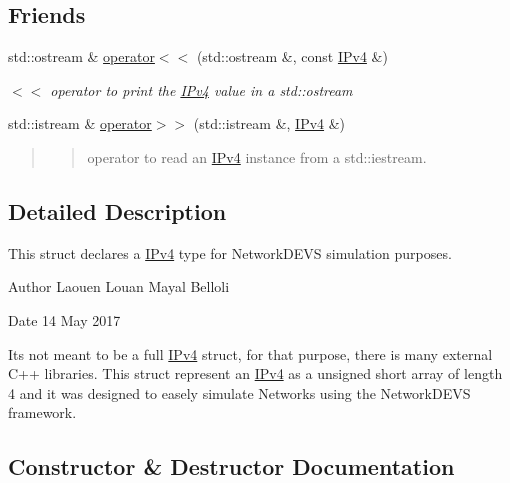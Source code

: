 \subsection*{Friends}
\begin{DoxyCompactItemize}
\item 
std\+::ostream \& \hyperlink{structIPv4_ab5644dcfa13678c430f256332e31c671}{operator$<$$<$} (std\+::ostream \&, const \hyperlink{structIPv4}{I\+Pv4} \&)
\begin{DoxyCompactList}\small\item\em $<$$<$ operator to print the \hyperlink{structIPv4}{I\+Pv4} value in a std\+::ostream \end{DoxyCompactList}\item 
std\+::istream \& \hyperlink{structIPv4_a47e7e07277bbcacf06f17b1c2fc59f7f}{operator$>$$>$} (std\+::istream \&, \hyperlink{structIPv4}{I\+Pv4} \&)
\begin{DoxyCompactList}\small\item\em \begin{quote}
\begin{quote}
operator to read an \hyperlink{structIPv4}{I\+Pv4} instance from a std\+::iestream. \end{quote}
\end{quote}
\end{DoxyCompactList}\end{DoxyCompactItemize}


\subsection{Detailed Description}
This struct declares a \hyperlink{structIPv4}{I\+Pv4} type for Network\+D\+E\+VS simulation purposes. 

\begin{DoxyAuthor}{Author}
Laouen Louan Mayal Belloli 
\end{DoxyAuthor}
\begin{DoxyDate}{Date}
14 May 2017
\end{DoxyDate}
It\textquotesingle{}s not meant to be a full \hyperlink{structIPv4}{I\+Pv4} struct, for that purpose, there is many external C++ libraries. This struct represent an \hyperlink{structIPv4}{I\+Pv4} as a unsigned short array of length 4 and it was designed to easely simulate Networks using the Network\+D\+E\+VS framework. 

\subsection{Constructor \& Destructor Documentation}
